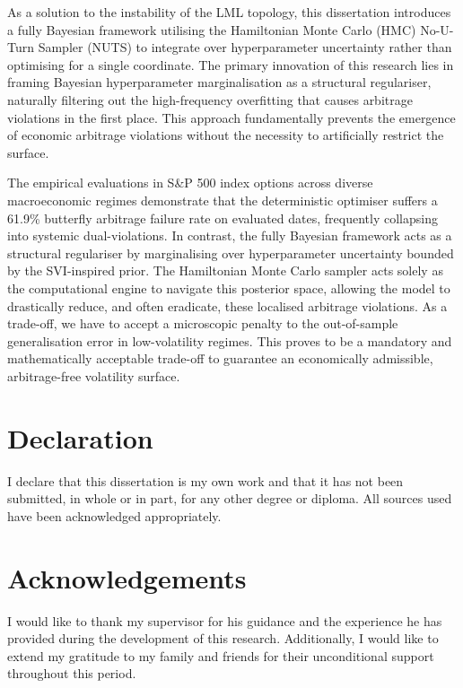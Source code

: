 \documentclass[12pt,oneside]{report}
\theoremstyle{definition}
\theoremstyle{remark}
\begin{document}
As a solution to the instability of the LML topology, this dissertation introduces a fully Bayesian framework utilising the Hamiltonian Monte Carlo (HMC) No-U-Turn Sampler (NUTS) to integrate over hyperparameter uncertainty rather than optimising for a single coordinate. The primary innovation of this research lies in framing Bayesian hyperparameter marginalisation as a structural regulariser, naturally filtering out the high-frequency overfitting that causes arbitrage violations in the first place. This approach fundamentally prevents the emergence of economic arbitrage violations without the necessity to artificially restrict the surface.

The empirical evaluations in S\&P 500 index options across diverse macroeconomic regimes demonstrate that the deterministic optimiser suffers a 61.9\% butterfly arbitrage failure rate on evaluated dates, frequently collapsing into systemic dual-violations. In contrast, the fully Bayesian framework acts as a structural regulariser by marginalising over hyperparameter uncertainty bounded by the SVI-inspired prior. The Hamiltonian Monte Carlo sampler acts solely as the computational engine to navigate this posterior space, allowing the model to drastically reduce, and often eradicate, these localised arbitrage violations. As a trade-off, we have to accept a microscopic penalty to the out-of-sample generalisation error in low-volatility regimes. This proves to be a mandatory and mathematically acceptable trade-off to guarantee an economically admissible, arbitrage-free volatility surface. 


\chapter*{Declaration}
I declare that this dissertation is my own work and that it has not been submitted, in whole or in part, for any other degree or diploma. All sources used have been acknowledged appropriately.

\chapter*{Acknowledgements}
I would like to thank my supervisor for his guidance and the experience he has provided during the development of this research.
Additionally, I would like to extend my gratitude to my family and friends for their unconditional support throughout this period.
\end{document}
